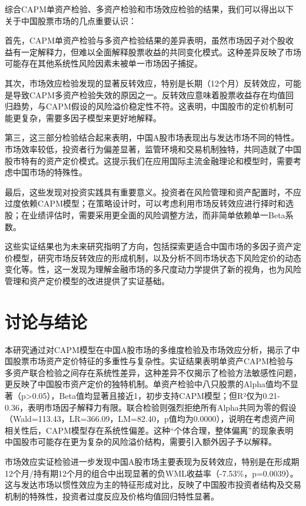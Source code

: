 \documentclass[12pt, a4paper]{article}
\begin{document}
综合CAPM单资产检验、多资产检验和市场效应检验的结果，我们可以得出以下关于中国股票市场的几点重要认识：

首先，CAPM单资产检验与多资产检验结果的差异表明，虽然市场因子对个股收益有一定解释力，但难以全面解释股票收益的共同变化模式。这种差异反映了市场可能存在其他系统性风险因素未被单一市场因子捕捉。

其次，市场效应检验发现的显著反转效应，特别是长期（12个月）反转效应，可能是导致CAPM多资产检验失效的原因之一。反转效应意味着股票收益存在均值回归趋势，与CAPM假设的风险溢价稳定性不符。这表明，中国股市的定价机制可能更复杂，需要多因子模型来更好地解释。

第三，这三部分检验结合起来表明，中国A股市场表现出与发达市场不同的特性。市场效率较低，投资者行为偏差显著，监管环境和交易机制独特，共同造就了中国股市特有的资产定价模式。这提示我们在应用国际主流金融理论和模型时，需要考虑中国市场的特殊性。

最后，这些发现对投资实践具有重要意义。投资者在风险管理和资产配置时，不应过度依赖CAPM模型；在策略设计时，可以考虑利用市场反转效应进行择时和选股；在业绩评估时，需要采用更全面的风险调整方法，而非简单依赖单一Beta系数。

这些实证结果也为未来研究指明了方向，包括探索更适合中国市场的多因子资产定价模型，研究市场反转效应的形成机制，以及分析不同市场状态下风险定价的动态变化等。性，这一发现为理解金融市场的多尺度动力学提供了新的视角，也为风险管理和资产定价模型的改进提供了实证基础。

\section{讨论与结论}

本研究通过对CAPM模型在中国A股市场的多维度检验及市场效应分析，揭示了中国股票市场资产定价特征的多重性与复杂性。实证结果表明单资产CAPM检验与多资产联合检验之间存在系统性差异，这种差异不仅揭示了检验方法敏感性问题，更反映了中国股市资产定价的独特机制。单资产检验中八只股票的Alpha值均不显著（p>0.05），Beta值均显著且接近1，初步支持CAPM模型；但R²仅为0.21-0.36，表明市场因子解释力有限。联合检验则强烈拒绝所有Alpha共同为零的假设（Wald=113.43，LR=366.09，LM=82.40，p值均为0.0000），说明在考虑资产间相关性后，CAPM模型存在系统性偏差。这种“个体合理，整体偏离”的现象表明中国股市可能存在更为复杂的风险溢价结构，需要引入额外因子予以解释。

市场效应实证检验进一步发现中国A股市场主要表现为反转效应，特别是在形成期12个月/持有期12个月的组合中出现显著的负WML收益率（-7.53\%，p=0.0039）。这与发达市场以惯性效应为主的特征形成对比，反映了中国股市投资者结构及交易机制的特殊性，投资者过度反应及价格均值回归特性显著。
\end{document}
